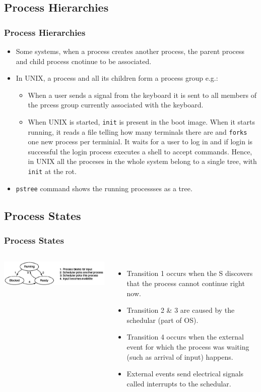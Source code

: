 \documentclass{beamer}
\begin{document}
\subsection{Process Hierarchies}
\begin{frame}
\frametitle{Process Hierarchies}
\begin{itemize}
\item Some systems, when a process creates another process, the parent process and child process cnotinue to be associated.
\item In UNIX, a process and all its children form a process group e.g.:
\begin{itemize}
\item When a user sends a signal from the keyboard it is sent to all members of the prcess group currently associated with the keyboard.
\item When UNIX is started, \texttt{init} is present in the boot image. When it starts running, it reads a file telling how many terminals there are and \texttt{forks} one new process per terminial. It waits for a user to log in and if login is successful the login process executes a shell to accept commands. Hence, in UNIX all the proceses in the whole system belong to a single tree, with \texttt{init} at the rot.
\end{itemize}
\item \texttt{pstree} command shows the running processses as a tree.
\end{itemize}
\end{frame}
\subsection{Process States}
\begin{frame}
\frametitle{Process States}
\begin{columns}[c]
\includegraphics[scale=0.35]{state1.png}
\begin{itemize}
\item Transition 1 occurs when the S discovers that the process cannot continue right now.
\item Transition 2 \& 3 are caused by the schedular (part of OS).
\item Transition 4 occurs when the external event for which the process was waiting (such as arrival of input) happens.
\item External events send electrical signals called interrupts to the schedular.
\end{itemize}
\end{columns}
\end{frame}
\end{document}
